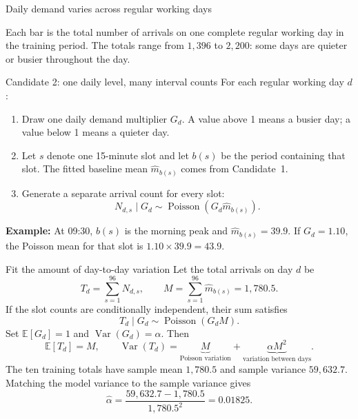 \documentclass{beamer}
\begin{document}
\begin{frame}{Daily demand varies across regular working days}
  \centering

  \raggedright
  \small
  Each bar is the total number of arrivals on one complete regular working day in the training period. The totals range from $1{,}396$ to $2{,}200$: some days are quieter or busier throughout the day.
\end{frame}

\begin{frame}{Candidate 2: one daily level, many interval counts}
  \small
  For each regular working day $d$:
  \begin{enumerate}
    \item Draw one daily demand multiplier $G_d$. A value above 1 means a busier day; a value below 1 means a quieter day.
    \item Let $s$ denote one 15-minute slot and let $b(s)$ be the period containing that slot. The fitted baseline mean $\widehat m_{b(s)}$ comes from Candidate~1.
    \item Generate a separate arrival count for every slot:
      \[
        N_{d,s}\mid G_d
          \sim\operatorname{Poisson}\!\left(G_d\widehat m_{b(s)}\right).
      \]
  \end{enumerate}

  \textbf{Example:} At 09:30, $b(s)$ is the morning peak and $\widehat m_{b(s)}=39.9$. If $G_d=1.10$, the Poisson mean for that slot is $1.10\times39.9=43.9$.
\end{frame}

\begin{frame}{Fit the amount of day-to-day variation}
  \small
  Let the total arrivals on day $d$ be
  \[
    T_d=\sum_{s=1}^{96}N_{d,s},
    \qquad
    M=\sum_{s=1}^{96}\widehat m_{b(s)}=1{,}780.5.
  \]
  If the slot counts are conditionally independent, their sum satisfies
  \[
    T_d\mid G_d\sim\operatorname{Poisson}(G_dM).
  \]
  Set $\mathbb E[G_d]=1$ and $\operatorname{Var}(G_d)=\alpha$. Then
  \[
    \mathbb E[T_d]=M,
    \qquad
    \operatorname{Var}(T_d)=\underbrace{M}_{\text{Poisson variation}}
      +\underbrace{\alpha M^2}_{\text{variation between days}}.
  \]
  The ten training totals have sample mean $1{,}780.5$ and sample variance $59{,}632.7$. Matching the model variance to the sample variance gives
  \[
    \widehat\alpha
      =\frac{59{,}632.7-1{,}780.5}{1{,}780.5^2}
      =0.01825.
  \]
\end{frame}
\end{document}
